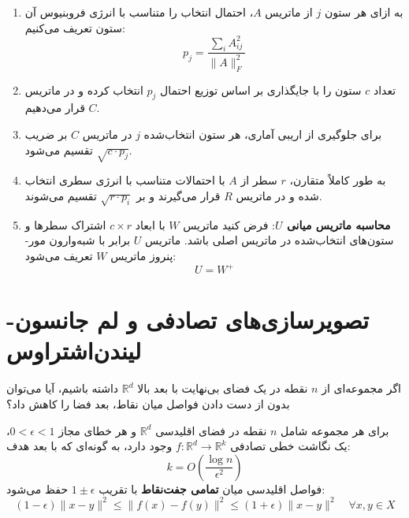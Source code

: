 \begin{algorithmbox}
\begin{enumerate}
    \item به ازای هر ستون $j$ از ماتریس $A$، احتمال انتخاب را متناسب با انرژی فروبنیوس آن ستون تعریف می‌کنیم:
    \begin{equation}
    p_j = \frac{\sum_{i} A_{ij}^2}{\|A\|_F^2}
    \end{equation}
    \item تعداد $c$ ستون را با جایگذاری بر اساس توزیع احتمال $p_j$ انتخاب کرده و در ماتریس $C$ قرار می‌دهیم.
    \item برای جلوگیری از اریبی آماری، هر ستون انتخاب‌شده $j$ در ماتریس $C$ بر ضریب $\sqrt{c \cdot p_j}$ تقسیم می‌شود.
    \item به طور کاملاً متقارن، $r$ سطر از $A$ با احتمالات متناسب با انرژی سطری انتخاب شده و در ماتریس $R$ قرار می‌گیرند و بر $\sqrt{r \cdot p_i}$ تقسیم می‌شوند.
    \item \textbf{محاسبه ماتریس میانی $U$}: فرض کنید ماتریس $W$ با ابعاد $c \times r$ اشتراک سطرها و ستون‌های انتخاب‌شده در ماتریس اصلی باشد. ماتریس $U$ برابر با شبه‌وارون مور-پنروز ماتریس $W$ تعریف می‌شود:
    \begin{equation}
    U = W^+
    \end{equation}
\end{enumerate}
\end{algorithmbox}

\section{تصویرسازی‌های تصادفی و لم جانسون-لیندن‌اشتراوس \texorpdfstring{}{(JL Lemma)}}
اگر مجموعه‌ای از $n$ نقطه در یک فضای بی‌نهایت با بعد بالا $\mathbb{R}^d$ داشته باشیم، آیا می‌توان بدون از دست دادن فواصل میان نقاط، بعد فضا را کاهش داد؟

\begin{theorem}
برای هر مجموعه شامل $n$ نقطه در فضای اقلیدسی $\mathbb{R}^d$ و هر خطای مجاز $0 < \epsilon < 1$، یک نگاشت خطی تصادفی $f: \mathbb{R}^d \to \mathbb{R}^k$ وجود دارد، به گونه‌ای که با بعد هدف:
\begin{equation}
k = O\left( \frac{\log n}{\epsilon^2} \right)
\end{equation}
فواصل اقلیدسی میان \textbf{تمامی جفت‌نقاط} با تقریب $1 \pm \epsilon$ حفظ می‌شود:
\begin{equation}
(1 - \epsilon) \|x - y\|^2 \le \|f(x) - f(y)\|^2 \le (1 + \epsilon) \|x - y\|^2 \quad \forall x, y \in X
\end{equation}
\end{theorem}

